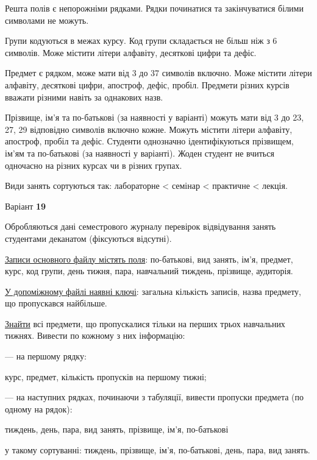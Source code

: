 \documentclass[11pt, ukrainian]{article}
\begin{document}
Решта полів є непорожніми рядками.
Рядки починатися та закінчуватися білими символами не можуть.

Групи кодуються в межах курсу.
Код групи складається не більш ніж з 6 символів.
Може містити літери алфавіту, десяткові цифри та дефіс.

Предмет є рядком, може мати від 3 до 37 символів включно.
Може містити літери алфавіту, десяткові цифри, апостроф, дефіс, пробіл.
Предмети різних курсів вважати різними навіть за однакових назв.

Прізвище, ім’я та по-батькові (за наявності у варіанті)
можуть мати від 3 до 23, 27, 29 відповідно символів включно кожне.
Можуть містити літери алфавіту, апостроф, пробіл та дефіс.
Студенти однозначно ідентифікуються прізвищем, ім’ям та по-батькові (за наявності у варіанті).
Жоден студент не вчиться одночасно на різних курсах чи в різних групах.

Види занять сортуються так: лабораторне < семінар < практичне < лекція.



\par
\newpage
{\center Варіант  \No \textbf { 19 }\par}
\bigskip
Обробляються дані семестрового журналу перевірок відвідування занять студентами деканатом (фіксуються відсутні). 

\underline{Записи основного файлу містять поля}: по-батькові, вид занять, ім’я, предмет, курс, код групи, день тижня, пара, навчальний тиждень, прізвище, аудиторія.

\underline{У допоміжному файлі наявні ключі}: загальна кількість записів, назва предмету, що пропускався найбільше.

\underline{Знайти} всі предмети, що пропускалися тільки на перших трьох навчальних тижнях. Вивести по кожному з них інформацію:\par
{\noindent}--- на першому рядку:\par
курс, предмет, кількість пропусків на першому тижні;

{\noindent}--- на наступних рядках, починаючи з табуляції, вивести пропуски предмета (по одному на рядок):\par
тиждень, день, пара, вид занять, прізвище, ім’я, по-батькові

{\noindent}у такому сортуванні: тиждень, прізвище, ім’я, по-батькові, день, пара, вид занять.

\end{document}
